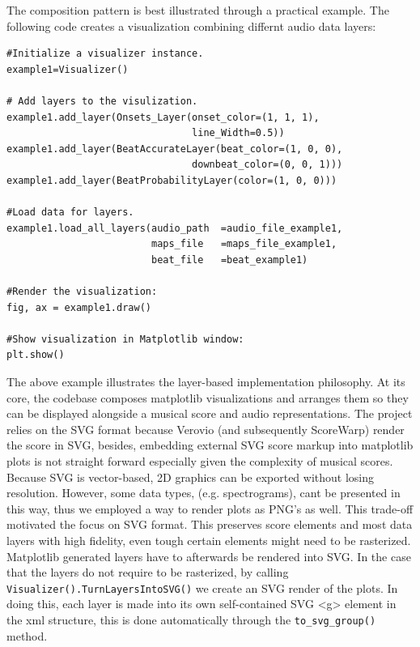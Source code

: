 \noindent The composition pattern is best illustrated through a practical example. The following code creates a visualization combining differnt audio data layers:

\begin{verbatim}
#Initialize a visualizer instance. 
example1=Visualizer()   

# Add layers to the visulization. 
example1.add_layer(Onsets_Layer(onset_color=(1, 1, 1), 
                                line_Width=0.5))
example1.add_layer(BeatAccurateLayer(beat_color=(1, 0, 0), 
                                downbeat_color=(0, 0, 1)))
example1.add_layer(BeatProbabilityLayer(color=(1, 0, 0)))

#Load data for layers.
example1.load_all_layers(audio_path  =audio_file_example1,
                         maps_file   =maps_file_example1,
                         beat_file   =beat_example1)
                            
#Render the visualization:
fig, ax = example1.draw()

#Show visualization in Matplotlib window:
plt.show()
\end{verbatim}

\noindent The above example illustrates the layer-based implementation philosophy. At its core, the codebase composes matplotlib visualizations and arranges them so they can be displayed alongside a musical score and audio representations. The project relies on the SVG format because Verovio (and subsequently ScoreWarp) render the score in SVG, besides, embedding external SVG score markup into matplotlib plots is not straight forward especially given the complexity of musical scores. Because SVG is vector-based, 2D graphics can be exported without losing resolution. However, some data types, (e.g. spectrograms), cant be presented in this way, thus we employed a way to render plots as PNG's as well. This trade-off motivated the focus on SVG format. This preserves score elements and most data layers with high fidelity, even tough certain elements might need to be rasterized.\\

\noindent Matplotlib generated layers have to afterwards be rendered into SVG. In the case that the layers do not require to be rasterized, by calling \texttt{Visualizer().TurnLayersIntoSVG()} we create an SVG render of the plots. In doing this, each layer is made into its own self-contained SVG <g> element in the xml structure, this is done automatically through the \texttt{to\_svg\_group()} method.\\

